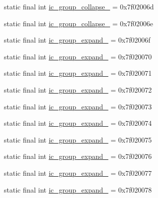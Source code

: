 \begin{CompactItemize}
\item 
static final int \hyperlink{classandroid_1_1support_1_1v7_1_1mediarouter_1_1_r_1_1drawable_31feee5071ff38d26ba2f72ddad88220}{ic\_\-group\_\-collapse\_} = 0x7f02006d
\item 
static final int \hyperlink{classandroid_1_1support_1_1v7_1_1mediarouter_1_1_r_1_1drawable_ee22deb304375b7f033cc1124f0e0f02}{ic\_\-group\_\-collapse\_} = 0x7f02006e
\item 
static final int \hyperlink{classandroid_1_1support_1_1v7_1_1mediarouter_1_1_r_1_1drawable_380a2649a076549a63a716fb9525203e}{ic\_\-group\_\-expand\_} = 0x7f02006f
\item 
static final int \hyperlink{classandroid_1_1support_1_1v7_1_1mediarouter_1_1_r_1_1drawable_7195b3206a73be5f418200cb3a9ac776}{ic\_\-group\_\-expand\_} = 0x7f020070
\item 
static final int \hyperlink{classandroid_1_1support_1_1v7_1_1mediarouter_1_1_r_1_1drawable_2e0fb892d5ddda5539546dbffc5a8fb2}{ic\_\-group\_\-expand\_} = 0x7f020071
\item 
static final int \hyperlink{classandroid_1_1support_1_1v7_1_1mediarouter_1_1_r_1_1drawable_d01b6d9041e03ca5b7e87fab489a8a31}{ic\_\-group\_\-expand\_} = 0x7f020072
\item 
static final int \hyperlink{classandroid_1_1support_1_1v7_1_1mediarouter_1_1_r_1_1drawable_3994623ea47d174be71e1647c0aadd66}{ic\_\-group\_\-expand\_} = 0x7f020073
\item 
static final int \hyperlink{classandroid_1_1support_1_1v7_1_1mediarouter_1_1_r_1_1drawable_ba5994e30eb9f0522de92cc019cb730d}{ic\_\-group\_\-expand\_} = 0x7f020074
\item 
static final int \hyperlink{classandroid_1_1support_1_1v7_1_1mediarouter_1_1_r_1_1drawable_122d45fc663d1eba8c425df7db7f27bf}{ic\_\-group\_\-expand\_} = 0x7f020075
\item 
static final int \hyperlink{classandroid_1_1support_1_1v7_1_1mediarouter_1_1_r_1_1drawable_ce783dfba9488eb8de30a897d04e120f}{ic\_\-group\_\-expand\_} = 0x7f020076
\item 
static final int \hyperlink{classandroid_1_1support_1_1v7_1_1mediarouter_1_1_r_1_1drawable_1d991221ec899e24ebc8bd58d3817d4c}{ic\_\-group\_\-expand\_} = 0x7f020077
\item 
static final int \hyperlink{classandroid_1_1support_1_1v7_1_1mediarouter_1_1_r_1_1drawable_935b1e702e6d248f8df0a17dc3ea18b7}{ic\_\-group\_\-expand\_} = 0x7f020078
\item 

\end{CompactItemize}
